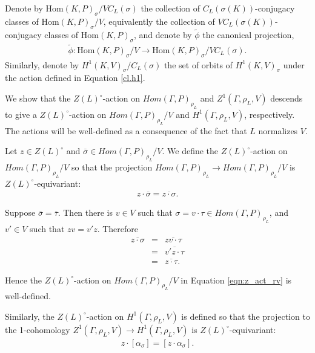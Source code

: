 	\begin{definition}
		Denote by $\mathrm{Hom}(K, P)_\sigma/VC_L(\sigma)$ the collection of $C_L(\sigma(K))$-conjugacy classes of $\mathrm{Hom}(K, P)_\sigma/V$, equivalently the collection of $VC_L(\sigma(K))$-conjugacy classes of $\mathrm{Hom}(K, P)_\sigma$, and denote by $\widetilde{\phi}$ the canonical projection,
		\begin{eqnarray*}
			\widetilde{\phi}: \mathrm{Hom}(K, P)_\sigma/V \rightarrow \mathrm{Hom}(K, P)_\sigma/VC_L(\sigma).
		\end{eqnarray*}
		Similarly, denote by $H^1(K, V)_\sigma/C_L(\sigma)$ the set of orbits of $H^1(K, V)_\sigma$ under the action defined in Equation \ref{cl.h1}.
	\end{definition}

We show that the $Z(L)^\circ$-action on $Hom(\Gamma, P)_{\rho_L}$ and $Z^1(\Gamma, \rho_L, V)$ descends to give a $Z(L)^\circ$-action on $Hom(\Gamma, P)_{\rho_L}/V$ and $H^1(\Gamma, \rho_L, V)$, respectively. The actions will be well-defined as a consequence of the fact that $L$ normalizes $V$.

Let $z \in Z(L)^\circ$ and $\overline{\sigma} \in Hom(\Gamma, P)_{\rho_L}/V$. We define the $Z(L)^\circ$-action on $Hom(\Gamma, P)_{\rho_L}/V$ so that the projection $Hom(\Gamma, P)_{\rho_L} \rightarrow Hom(\Gamma, P)_{\rho_L}/V$ is $Z(L)^\circ$-equivariant:
\begin{eqnarray}
  z \cdot \overline{\sigma} = \overline{z \cdot \sigma}.
  \label{eqn:z_act_rv}
\end{eqnarray}

Suppose $\overline{\sigma} = \overline{\tau}$. Then there is $v \in V$ such that $\sigma = v \cdot \tau \in Hom(\Gamma, P)_{\rho_L}$, and $v' \in V$ such that $zv = v' z$. Therefore
\begin{eqnarray*}
  \overline{z \cdot \sigma} &=& \overline{zv \cdot \tau} \\
  &=& \overline{v' z \cdot \tau} \\
  &=& \overline{z \cdot \tau}.
\end{eqnarray*}

Hence the $Z(L)^\circ$-action on $Hom(\Gamma, P)_{\rho_L}/V$ in Equation \ref{eqn:z_act_rv} is well-defined.

Similarly, the $Z(L)^\circ$-action on $H^1(\Gamma, \rho_L, V)$ is defined so that the projection to the 1-cohomology $Z^1(\Gamma, \rho_L, V) \rightarrow H^1(\Gamma, \rho_L, V)$ is $Z(L)^\circ$-equivariant:
\begin{eqnarray}
  z \cdot [\alpha_\sigma] = [z \cdot \alpha_\sigma].
  \label{eqn:z_act_h}
\end{eqnarray}

